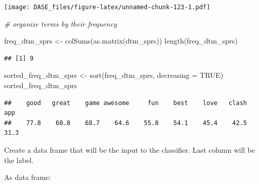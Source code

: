 \documentclass[
]{book}
\newenvironment{Shaded}{\begin{snugshade}}{\end{snugshade}}
\newcommand{\AttributeTok}[1]{\textcolor[rgb]{0.77,0.63,0.00}{#1}}
\newcommand{\CommentTok}[1]{\textcolor[rgb]{0.56,0.35,0.01}{\textit{#1}}}
\newcommand{\ConstantTok}[1]{\textcolor[rgb]{0.00,0.00,0.00}{#1}}
\newcommand{\DecValTok}[1]{\textcolor[rgb]{0.00,0.00,0.81}{#1}}
\newcommand{\FunctionTok}[1]{\textcolor[rgb]{0.00,0.00,0.00}{#1}}
\newcommand{\NormalTok}[1]{#1}
\newcommand{\OtherTok}[1]{\textcolor[rgb]{0.56,0.35,0.01}{#1}}
\newcommand{\SpecialCharTok}[1]{\textcolor[rgb]{0.00,0.00,0.00}{#1}}
\begin{document}
\texttt{[image: DASE\_files/figure-latex/unnamed-chunk-123-1.pdf]}

\begin{Shaded}
\begin{Highlighting}[]
\CommentTok{\# organize terms by their frequency }

\NormalTok{freq\_dtm\_sprs }\OtherTok{\textless{}{-}} \FunctionTok{colSums}\NormalTok{(}\FunctionTok{as.matrix}\NormalTok{(dtm\_sprs))}
\FunctionTok{length}\NormalTok{(freq\_dtm\_sprs)}
\end{Highlighting}
\end{Shaded}

\begin{verbatim}
## [1] 9
\end{verbatim}

\begin{Shaded}
\begin{Highlighting}[]
\NormalTok{sorted\_freq\_dtm\_sprs }\OtherTok{\textless{}{-}} \FunctionTok{sort}\NormalTok{(freq\_dtm\_sprs, }\AttributeTok{decreasing =} \ConstantTok{TRUE}\NormalTok{)}
\NormalTok{sorted\_freq\_dtm\_sprs}
\end{Highlighting}
\end{Shaded}

\begin{verbatim}
##    good   great    game awesome     fun    best    love   clash     app 
##    77.8    68.8    68.7    64.6    55.8    54.1    45.4    42.5    31.3
\end{verbatim}

Create a data frame that will be the input to the classifier.
Last column will be the label.

As data frame:

\begin{Shaded}
\end{Shaded}
\end{document}
